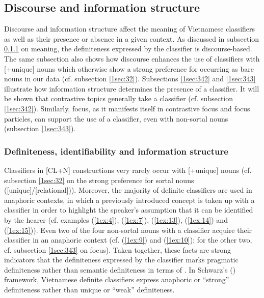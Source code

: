 \documentclass[output=paper]{langsci/langscibook}
\begin{document}
\subsection{Discourse and information structure}\label{1sec:34}
Discourse and information structure affect the meaning of Vietnamese classifiers as well as their presence or absence in a given context. As discussed in subsection \ref{1sec:341} on meaning, the definiteness expressed by the classifier is discourse-based. The same subsection also shows how discourse enhances the use of classifiers with [+unique] nouns which otherwise show a strong preference for occurring as bare nouns in our data (cf. subsection \ref{1sec:32}). Subsections \ref{1sec:342} and \ref{1sec:343} illustrate how information structure determines the presence of a classifier. It will be shown that contrastive topics generally take a classifier (cf. subsection \ref{1sec:342}). Similarly, focus, as it manifests itself in contrastive focus and focus particles, can support the use of a classifier, even with non-sortal nouns (subsection \ref{1sec:343}).


\subsubsection{Definiteness, identifiability and information structure}\label{1sec:341}
Classifiers in [CL+N] constructions very rarely occur with [+unique] nouns (cf. subsection \ref{1sec:32} on the strong preference for sortal nouns ([\minus unique]/[\minus relational])). Moreover, the majority of definite classifiers are used in anaphoric contexts, in which a previously introduced concept is taken up with a classifier in order to highlight the speaker's assumption that it can be identified by the hearer (cf. examples (\ref{1ex:4}), (\ref{1ex:7}), (\ref{1ex:13}), (\ref{1ex:14}) and (\ref{1ex:15})). Even two of the four non-sortal nouns with a classifier acquire their classifier in an anaphoric context (cf. (\ref{1ex:9}) and (\ref{1ex:10}); for the other two, cf. subsection \ref{1sec:343} on focus). Taken together, these facts are strong indicators that the definiteness expressed by the classifier marks pragmatic definiteness rather than semantic definiteness in terms of \cite{lobner:85}. In Schwarz's (\citeyear{schwarz:09,schwarz:13}) framework, Vietnamese definite classifiers express anaphoric or ``strong'' definiteness rather than unique or ``weak'' definiteness.
\end{document}
